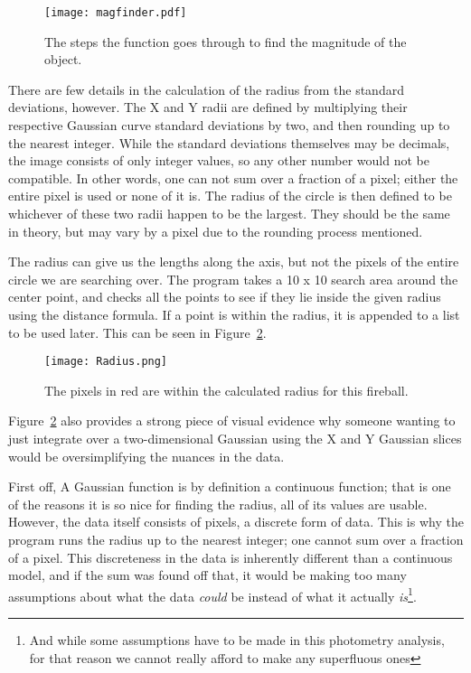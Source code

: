 \begin{figure}[htpb]
	\centering
	\texttt{[image: magfinder.pdf]}
	\caption{The steps the function goes through to find the magnitude of the object.}
	\label{fig:magfinder}
\end{figure}


There are few details in the calculation of the radius from the standard deviations, however. The X and Y radii are defined by multiplying their respective Gaussian curve standard deviations by two, and then rounding up to the nearest integer. While the standard deviations themselves may be decimals, the image consists of only integer values, so any other number would not be compatible. In other words, one can not sum over a fraction of a pixel; either the entire pixel is used or none of it is. The radius of the circle is then defined to be whichever of these two radii happen to be the largest. They should be the same in theory, but may vary by a pixel due to the rounding process mentioned. 

The radius can give us the lengths along the axis, but not the pixels of the entire circle we are searching over. The program takes a 10 x 10 search area around the center point, and checks all the points to see if they lie inside the given radius using the distance formula. If a point is within the radius, it is appended to a list to be used later. This can be seen in Figure~\ref{fig:radius}.

\begin{figure}[ht!]
	\centering
	\texttt{[image: Radius.png]}
	\caption{The pixels in red are within the calculated radius for this fireball.}
	\label{fig:radius}
\end{figure}

Figure~\ref{fig:radius} also provides a strong piece of visual evidence why someone wanting to just integrate over a two-dimensional Gaussian using the X and Y Gaussian slices would be oversimplifying the nuances in the data. 

First off, A Gaussian function is by definition a continuous function; that is one of the reasons it is so nice for finding the radius, all of its values are usable. However, the data itself consists of pixels, a discrete form of data. This is why the program runs the radius up to the nearest integer; one cannot sum over a fraction of a pixel. This discreteness in the data is inherently different than a continuous model, and if the sum was found off that, it would be making too many assumptions about what the data \textit{could} be instead of what it actually \textit{is}\footnote{And while some assumptions have to be made in this photometry analysis, for that reason we cannot really afford to make any superfluous ones}.

